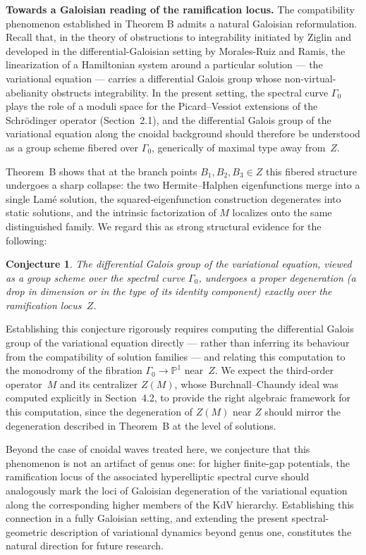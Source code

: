 \documentclass[a4paper,12pt]{article}
\newtheorem{conjecture}{Conjecture}[section]
\begin{document}
\medskip
\noindent\textbf{Towards a Galoisian reading of the ramification locus.}
The compatibility phenomenon established in Theorem B admits a natural
Galoisian reformulation. Recall that, in the theory of obstructions to
integrability initiated by Ziglin and developed in the differential-Galoisian
setting by Morales-Ruiz and Ramis, the linearization of a Hamiltonian system
around a particular solution --- the variational equation --- carries a
differential Galois group whose non-virtual-abelianity obstructs
integrability. In the present setting, the spectral curve $\Gamma_0$ plays the
role of a moduli space for the Picard--Vessiot extensions of the
Schr\"odinger operator (Section~2.1), and the differential Galois group of
the variational equation along the cnoidal background should therefore be
understood as a group scheme fibered over $\Gamma_0$, generically of maximal
type away from~$Z$.

Theorem~B shows that at the branch points $B_1, B_2, B_3 \in Z$ this fibered
structure undergoes a sharp collapse: the two Hermite--Halphen eigenfunctions
merge into a single Lam\'e solution, the squared-eigenfunction construction
degenerates into static solutions, and the intrinsic factorization of $M$
localizes onto the same distinguished family. We regard this as strong
structural evidence for the following:

\begin{conjecture}
The differential Galois group of the variational equation, viewed as a group
scheme over the spectral curve $\Gamma_0$, undergoes a proper degeneration
(a drop in dimension or in the type of its identity component) exactly over
the ramification locus~$Z$. 
\end{conjecture}

Establishing this conjecture rigorously requires computing the differential
Galois group of the variational equation directly --- rather than inferring
its behaviour from the compatibility of solution families --- and relating
this computation to the monodromy of the fibration $\Gamma_0 \to
\mathbb{P}^1$ near~$Z$. We expect the third-order operator~$M$ and its
centralizer $Z(M)$, whose Burchnall--Chaundy ideal was computed explicitly in
Section~4.2, to provide the right algebraic framework for this computation,
since the degeneration of $Z(M)$ near $Z$ should mirror the degeneration
described in Theorem~B at the level of solutions.

Beyond the case of cnoidal waves treated here, we conjecture that this
phenomenon is not an artifact of genus one: for higher finite-gap
potentials, the ra\-mification locus of the associated hyperelliptic spectral
curve should analogously mark the loci of Galoisian degeneration of the
variational equation along the corresponding higher members of the KdV
hierarchy. Establishing this connection in a fully Galoisian setting, and
extending the present spectral-geometric description of variational
dynamics beyond genus one, constitutes the natural direction for future
research.
\end{document}

